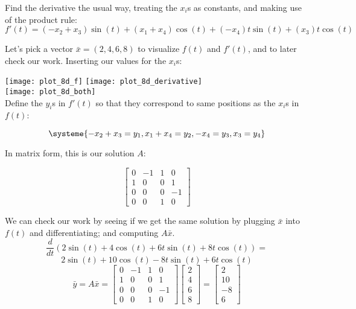 \documentclass[12pt]{article}
\begin{document}
Find the derivative the usual way, treating the $x_i$s as constants, and making use of the product
rule:
\[
f'(t) = (-x_2 + x_3)\sin(t) + (x_1 + x_4)\cos(t) + (-x_4)t\sin(t) + (x_3)t\cos(t)
\]

Let's pick a vector $\bar{x}=(2,4,6,8)$ to visualize $f(t)$ and $f'(t)$, and to later check our
work. Inserting our values for the $x_i$s:

\texttt{[image: plot\_8d\_f]} \texttt{[image: plot\_8d\_derivative]} \\
\texttt{[image: plot\_8d\_both]} \\
\newpage
Define the $y_i$s in $f'(t)$ so that they correspond to same positions as the $x_i$s in $f(t)$:

\[
\systeme{-x_2 + x_3 = y_1, x_1 + x_4 = y_2, -x_4 = y_3,x_3 = y_4}
\]

In matrix form, this is our solution $A$:

\[
\begin{bmatrix}
  0 & -1 & 1 & 0 \\
  1 & 0 & 0 & 1 \\
  0 & 0 & 0 & -1 \\
  0 & 0 & 1 & 0 
\end{bmatrix}
\]

We can check our work by seeing if we get the same solution by plugging
$\bar{x}$ into $f(t)$ and differentiating; and computing $A\bar{x}$. 
\[
  \frac{d}{dt}(2\sin(t)+4\cos(t)+6t\sin(t)+8t\cos(t)) = 
\]
\[
  2\sin(t)+10\cos(t)-8t\sin(t)+6t\cos(t)
\]
\bigbreak{}
\[
  \bar{y} = A\bar{x} = 
  \begin{bmatrix}
    0 & -1 & 1 & 0 \\
    1 & 0 & 0 & 1 \\
    0 & 0 & 0 & -1 \\
    0 & 0 & 1 & 0 
  \end{bmatrix}
  \begin{bmatrix} 2 \\ 4 \\ 6 \\ 8\end{bmatrix} = 
  \begin{bmatrix} 2 \\ 10 \\ -8 \\ 6 \end{bmatrix}
\]

\newpage
\end{document}
